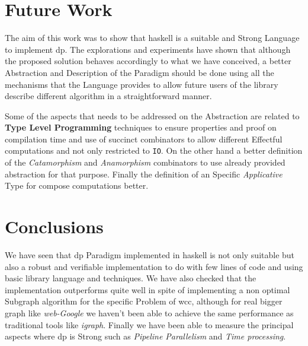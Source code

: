 \documentclass[12pt]{article}
\begin{document}
\section{Future Work}
The aim of this work was to show that \acrshort{haskell} is a suitable and Strong Language to implement \acrfull{dp}. The explorations and experiments have shown that although 
the proposed solution behaves accordingly to what we have conceived, a better Abstraction and Description of the Paradigm should be done using all the mechanisms that the Language provides 
to allow future users of the library describe different algorithm in a straightforward manner.

Some of the aspects that needs to be addressed on the Abstraction are related to \textbf{Type Level Programming} techniques to ensure properties and proof on compilation time and use
of succinct combinators to allow different Effectful computations and not only restricted to \texttt{IO}. On the other hand a better definition of the \textit{Catamorphism} and \textit{Anamorphism}
combinators to use already provided abstraction for that purpose. Finally the definition of an Specific \textit{Applicative} Type for compose computations better.

\section{Conclusions}
We have seen that \acrfull{dp} Paradigm implemented in \acrfull{haskell} is not only suitable but also a robust and verifiable implementation to do with few lines of code and using basic library language and techniques.
We have also checked that the implementation outperforms quite well in spite of implementing a non optimal Subgraph algorithm for the specific Problem of \acrshort{wcc}, although for real bigger graph like \textit{web-Google}
we haven't been able to achieve the same performance as traditional tools like \textit{igraph}.
Finally we have been able to measure the principal aspects where \acrshort{dp} is Strong such as \textit{Pipeline Parallelism} and \textit{Time processing}.

\clearpage

\printglossary[type=\acronymtype]

\printglossary




\appendix
\end{document}
